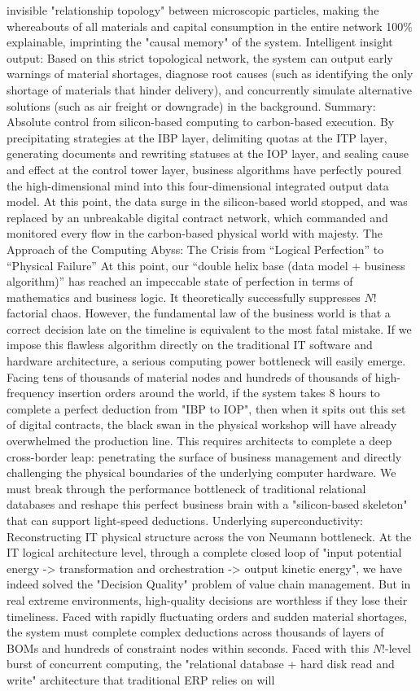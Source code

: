 \documentclass[11pt,a4paper]{article}
\begin{document}
invisible "relationship topology" between microscopic particles, making the whereabouts of all materials and capital consumption in the entire network 100\% explainable, imprinting the "causal memory" of the system. Intelligent insight output: Based on this strict topological network, the system can output early warnings of material shortages, diagnose root causes (such as identifying the only shortage of materials that hinder delivery), and concurrently simulate alternative solutions (such as air freight or downgrade) in the background. Summary: Absolute control from silicon-based computing to carbon-based execution. By precipitating strategies at the IBP layer, delimiting quotas at the ITP layer, generating documents and rewriting statuses at the IOP layer, and sealing cause and effect at the control tower layer, business algorithms have perfectly poured the high-dimensional mind into this four-dimensional integrated output data model. At this point, the data surge in the silicon-based world stopped, and was replaced by an unbreakable digital contract network, which commanded and monitored every flow in the carbon-based physical world with majesty. The Approach of the Computing Abyss: The Crisis from “Logical Perfection” to “Physical Failure” At this point, our “double helix base (data model + business algorithm)” has reached an impeccable state of perfection in terms of mathematics and business logic. It theoretically successfully suppresses $N!$ factorial chaos. However, the fundamental law of the business world is that a correct decision late on the timeline is equivalent to the most fatal mistake. If we impose this flawless algorithm directly on the traditional IT software and hardware architecture, a serious computing power bottleneck will easily emerge. Facing tens of thousands of material nodes and hundreds of thousands of high-frequency insertion orders around the world, if the system takes 8 hours to complete a perfect deduction from "IBP to IOP", then when it spits out this set of digital contracts, the black swan in the physical workshop will have already overwhelmed the production line. This requires architects to complete a deep cross-border leap: penetrating the surface of business management and directly challenging the physical boundaries of the underlying computer hardware. We must break through the performance bottleneck of traditional relational databases and reshape this perfect business brain with a "silicon-based skeleton" that can support light-speed deductions. Underlying superconductivity: Reconstructing IT physical structure across the von Neumann bottleneck. At the IT logical architecture level, through a complete closed loop of "input potential energy -> transformation and orchestration -> output kinetic energy", we have indeed solved the "Decision Quality" problem of value chain management. But in real extreme environments, high-quality decisions are worthless if they lose their timeliness. Faced with rapidly fluctuating orders and sudden material shortages, the system must complete complex deductions across thousands of layers of BOMs and hundreds of constraint nodes within seconds. Faced with this $N!$-level burst of concurrent computing, the "relational database + hard disk read and write" architecture that traditional ERP relies on will 
\end{document}
